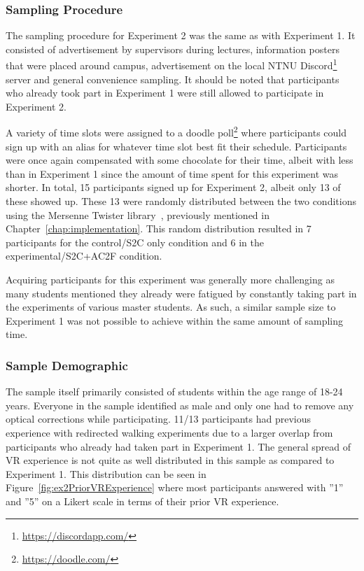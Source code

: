 \subsubsection{Sampling Procedure}
The sampling procedure for Experiment 2 was the same as with Experiment 1. It consisted of advertisement by supervisors during lectures, information posters that were placed around campus, advertisement on the local NTNU Discord\footnote{\url{https://discordapp.com/}} server and general convenience sampling. It should be noted that participants who already took part in Experiment 1 were still allowed to participate in Experiment 2.

A variety of time slots were assigned to a doodle poll\footnote{\url{https://doodle.com/}} where participants could sign up with an alias for whatever time slot best fit their schedule. Participants were once again compensated with some chocolate for their time, albeit with less than in Experiment 1 since the amount of time spent for this experiment was shorter. In total, 15 participants signed up for Experiment 2, albeit only 13 of these showed up. These 13 were randomly distributed between the two conditions using the Mersenne Twister library~\cite{MersenneTwisterLibraryLink},  previously mentioned in  Chapter~\ref{chap:implementation}. This random distribution resulted in 7 participants for the control/S2C only condition and 6 in the experimental/S2C+AC2F condition. 

Acquiring participants for this experiment was generally more challenging as many students mentioned they already were fatigued by constantly taking part in the experiments of various master students. As such, a similar sample size to Experiment 1 was not possible to achieve within the same amount of sampling time. 

\subsubsection{Sample Demographic}
The sample itself primarily consisted of students within the age range of 18-24 years. Everyone in the sample identified as male and only one had to remove any optical corrections while participating. 11/13 participants had previous experience with redirected walking experiments due to a larger overlap from participants who already had taken part in Experiment 1. The general spread of VR experience is not quite as well distributed in this sample as compared to Experiment 1. This distribution can be seen in Figure~\ref{fig:ex2PriorVRExperience} where most participants answered with ''1'' and ''5'' on a Likert scale in terms of their prior VR experience.

